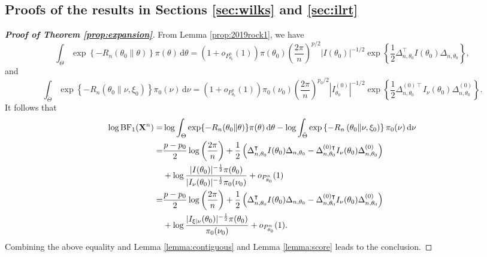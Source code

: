 \documentclass[11pt]{article}
\newcommand{\myT}{\intercal}
\theoremstyle{plain}
\theoremstyle{definition}
\theoremstyle{remark}
\begin{document}
\begin{appendices}
\section{Proofs of the results in Sections \ref{sec:wilks} and \ref{sec:ilrt}}


    \begin{proof}[\textbf{Proof of Theorem \ref{prop:expansion}}]
From Lemma \ref{prop:2019rock1}, we have
$$
    \int_{\Theta}
    \exp\left\{-R_n(\theta_0\| \theta) \right\} \pi(\theta)
\, \mathrm d \theta
    =
    (1+o_{P^n_{\theta_0}}(1))
    \pi(\theta_0)
    \left(\frac{2\pi}{ n}\right)^{{p}/{2}}
    |I(\theta_0)|^{-{1}/{2}} 
    \exp
    \left\{ 
        \frac{1}{2}\Delta_{n,\theta_0}^\myT  I({\theta_0})\Delta_{n,\theta_0}
\right\}
,
$$
and
\begin{equation*}
    \int_{\tilde \Theta}
    \exp\left\{- R_n\left(\theta_0\| \nu, \xi_0 \right)\right\} \pi_0(\nu)
\, \mathrm d \nu
    =
    (1+o_{P^n_{\theta_0}}(1))
    \pi_0(\nu_0)
    \left(\frac{2\pi}{ n}\right)^{{p_0}/{2}}
     |I_{\theta_0}^{(0)}|^{-{1}/{2}} 
     \exp\left\{ 
         \frac{1}{2}\Delta_{n,\theta_0}^{{(0)}\myT} I_{\nu}(\theta_0)\Delta^{(0)}_{n,\theta_0}
     \right\}
     .
\end{equation*}
It follows that
\begin{align*}
    \log \text{BF}_1 (\BX^{n})
    =&
    \log
    \int_{\Theta}
    \exp\{- R_n(\theta_0\| \theta)\} \pi(\theta)
\, \mathrm d \theta
-
    \log \int_{\tilde \Theta}
    \exp\left\{- R_n\left(\theta_0\| \nu, \xi_0 \right)\right\} \pi_0(\nu)
\, \mathrm d \nu
    \\
    =&
   {\frac{p-p_0}{2}} \log \left( \frac{2\pi}{n} \right)
+
        \frac 1 2 \left( 
            \Delta_{n,\theta_0}^\myT  I(\theta_0)  \Delta_{n,\theta_0}
            -
            \Delta_{n,\theta_0}^{{(0)}\myT} I_{\nu}(\theta_0)\Delta^{(0)}_{n,\theta_0}
        \right)
        \\
   &+
   \log
       \frac{
           |I(\theta_0)|^{-\frac 1 2}\pi(\theta_0) 
   }{
       |I_\nu(\theta_0)|^{-\frac 1 2}\pi_0(\nu_0)
}
    +o_{P^n_{\theta_0}}(1)
    \\
    =&
   {\frac{p-p_0}{2}} \log \left( \frac{2\pi}{n} \right)
+
        \frac 1 2 \left( 
            \Delta_{n,\theta_0}^\myT  I(\theta_0)  \Delta_{n,\theta_0}
            -
            \Delta_{n,\theta_0}^{{(0)}\myT} I_{\nu}(\theta_0)\Delta^{(0)}_{n,\theta_0}
        \right)
        \\
   &+
   \log
       \frac{
           |I_{\xi | \nu}(\theta_0)|^{-\frac 1 2}\pi(\theta_0) 
   }{
    \pi_0(\nu_0)
}
    +o_{P^n_{\theta_0}}(1)
    .
\end{align*}
Combining the above equality and Lemma \ref{lemma:contiguous} and Lemma \ref{lemma:score} leads to the conclusion.
    \end{proof}




\end{appendices}
\end{document}
